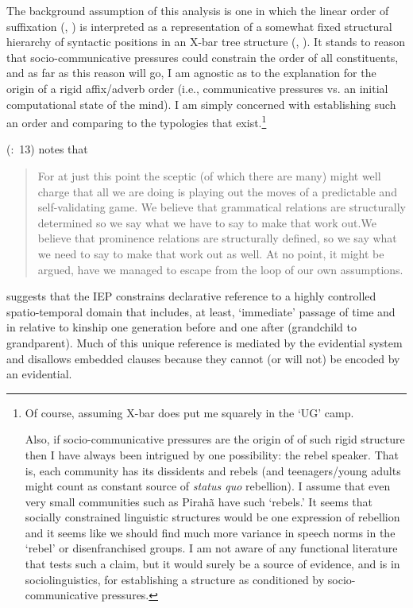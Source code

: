 \documentclass[11pt]{article}
\newcommand{\pgcitet}[2]{\citeauthor{#1} (\citeyear{#1}:~#2)}
\begin{document}
The background assumption of this analysis is one in which the linear order of suffixation (\citealt{bybee85morph}, \citealt{rice00scope}) is interpreted as a representation of a somewhat fixed structural hierarchy of syntactic positions in an X-bar tree structure (\citealt{baker85mirror}, \citealt{cinque99adverbs}). It stands to reason that socio-communicative pressures could constrain the order of all constituents, and as far as this reason will go, I am agnostic as to the explanation for the origin of a rigid affix/adverb order (i.e., communicative pressures vs. an initial computational state of the mind). I am simply concerned with establishing such an order and comparing to the typologies that exist.\footnote{Of course, assuming X-bar does put me squarely in the `UG' camp.
 
Also, if socio-communicative pressures are the origin of of such rigid structure then I have always been intrigued by one possibility: the rebel speaker. That is, each community has its dissidents and rebels (and teenagers/young adults might count as constant source of \textsl{status quo} rebellion). I assume that even very small communities such as Pirah\~a have such `rebels.' It seems that socially constrained linguistic structures would be one expression of rebellion and it seems like we should find much more variance in speech norms in the `rebel' or disenfranchised groups. I am not aware of any functional literature that tests such a claim, but it would surely be a source of evidence, and is in sociolinguistics, for establishing a structure as conditioned by socio-communicative pressures.}

\pgcitet{mccloskey07language}{13} notes that
\begin{quote}
For at just this point the sceptic (of which there are many) might well charge that all we are doing is playing out the moves of a predictable and self-validating game. We believe that grammatical relations are structurally determined so we say what we have to say to make that work out.We believe that prominence relations are
structurally defined, so we say what we need to say to make that work out as well. At no point, it might be argued, have we managed to escape from the loop of our own assumptions.
\end{quote}     

\cite{everett09response} suggests that the IEP constrains declarative reference to a highly controlled spatio-temporal domain that includes, at least, `immediate' passage of time and in relative to kinship one generation before and one after (grandchild to grandparent). Much of this unique reference is mediated by the evidential system and disallows embedded clauses because they cannot (or will not) be encoded by an evidential.
\end{document}
